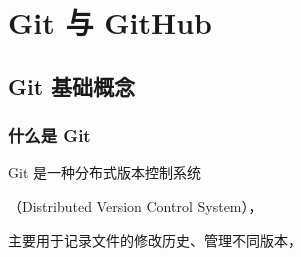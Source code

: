 




%







%














\chapter{Git 与 GitHub}

\label{chap:git_github}



\section{Git 基础概念}



\subsection{什么是 Git}



Git 是一种分布式版本控制系统

（Distributed Version Control System），

主要用于记录文件的修改历史、管理不同版本，

